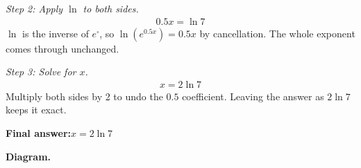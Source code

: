 \documentclass[11pt]{article}
\begin{document}
\textit{Step 2: Apply \( \ln \) to both sides.}
\[\begin{gathered}
0.5x = \ln 7
\end{gathered}\]
\( \ln \) is the inverse of \( e^{\square} \), so \( \ln(e^{0.5x}) = 0.5x \) by cancellation. The whole exponent comes through unchanged.

\textit{Step 3: Solve for \( x \).}
\[\begin{gathered}
x = 2\ln 7
\end{gathered}\]
Multiply both sides by 2 to undo the \( 0.5 \) coefficient. Leaving the answer as \( 2\ln 7 \) keeps it exact.

\begin{answerbox}
\textbf{Final answer:}\quad \(\displaystyle  x = 2\ln 7 \)
\end{answerbox}
\textbf{Diagram.}
\end{document}
